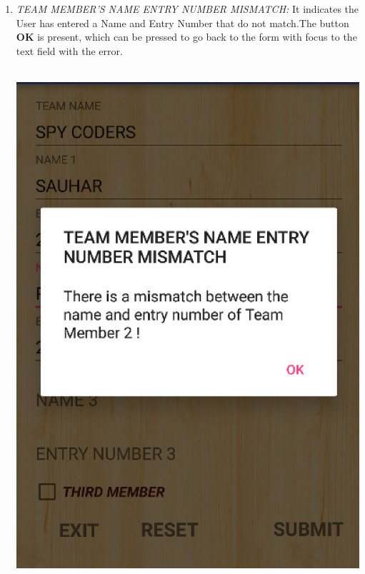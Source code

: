 \documentclass[12pt]{article}
\begin{document}
\begin{itemize}
\begin{enumerate}
\begin{enumerate}
            \item \textit{TEAM MEMBER'S NAME ENTRY NUMBER MISMATCH:} It indicates the User has entered a Name and Entry Number that do not match.The button \textbf{OK} is present, which can be pressed to go back to the form with focus to the text field with the error.
            \\
            \\
            \par
             \begin{minipage}{\linewidth}
        	    \centering
	            \includegraphics[scale=.7]{TEAM_MEMBER'S_NAME_ENTRY_NUMBER_MISMATCH.png}
            \end{minipage}
            \\
            \\

\end{enumerate}
\end{enumerate}
\end{itemize}
\end{document}
